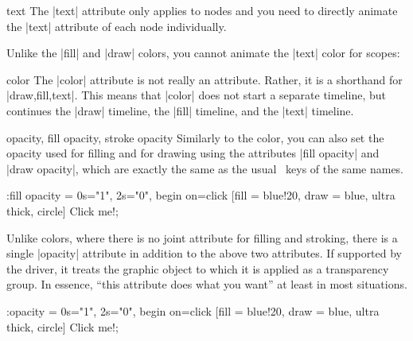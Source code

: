\begin{tikzanimateattribute}{text}
    The |text| attribute only applies to nodes and you need to directly animate
    the |text| attribute of each node individually.
\begin{codeexample}[imagesource={standalone/pgfmanual-en-tikz-animations-animation-21.svg}]
\end{codeexample}
    Unlike the |fill| and |draw| colors, you cannot animate the |text| color
    for scopes:
\begin{codeexample}[imagesource={standalone/pgfmanual-en-tikz-animations-animation-22.svg}]
\end{codeexample}
\end{tikzanimateattribute}

\begin{tikzanimateattribute}{color}
    The |color| attribute is not really an attribute. Rather, it is a shorthand
    for |{draw,fill,text}|. This means that |color| does not start a separate
    timeline, but continues the |draw| timeline, the |fill| timeline, and the
    |text| timeline.
\end{tikzanimateattribute}

\begin{tikzanimateattribute}{opacity, fill opacity, stroke opacity}
    Similarly to the color, you can also set the opacity used for filling and
    for drawing using the attributes |fill opacity| and |draw opacity|, which
    are exactly the same as the usual \tikzname\ keys of the same names.
\begin{codeexample}[imagesource={standalone/pgfmanual-en-tikz-animations-animation-23.svg}]
\tikz \node :fill opacity = { 0s="1", 2s="0", begin on=click }
  [fill = blue!20, draw = blue, ultra thick, circle] {Click me!};
\end{codeexample}
    Unlike colors, where there is no joint attribute for filling and stroking,
    there is a single |opacity| attribute in addition to the above two
    attributes. If supported by the driver, it treats the graphic object to
    which it is applied as a transparency group. In essence, ``this attribute
    does what you want'' at least in most situations.
\begin{codeexample}[imagesource={standalone/pgfmanual-en-tikz-animations-animation-24.svg}]
\tikz \node :opacity = { 0s="1", 2s="0", begin on=click }
  [fill = blue!20, draw = blue, ultra thick, circle] {Click me!};
\end{codeexample}
\end{tikzanimateattribute}

